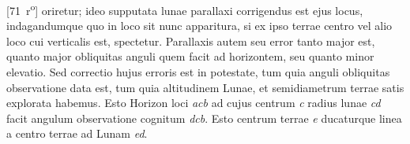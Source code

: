 [71~r\textsuperscript{o}] oriretur; ideo supputata lunae\protect{} parallaxi\protect{} corrigendus est ejus locus, indagandumque quo in loco sit nunc apparitura, si ex ipso terrae centro vel alio loco cui verticalis est, spectetur. Parallaxis\protect{} autem seu error tanto major est, quanto major obliquitas anguli quem facit ad horizontem, seu quanto minor elevatio. Sed correctio hujus erroris est in potestate, tum quia anguli  obliquitas observatione data est, tum quia altitudinem Lunae\protect{}, et semidiametrum terrae satis explorata habemus. Esto Horizon loci \textit{acb} ad cujus centrum \textit{c} radius lunae\protect{} \textit{cd} facit angulum observatione cognitum \textit{dcb}. Esto centrum terrae \textit{e} ducaturque linea a centro terrae ad Lunam\protect{} \textit{ed}.
